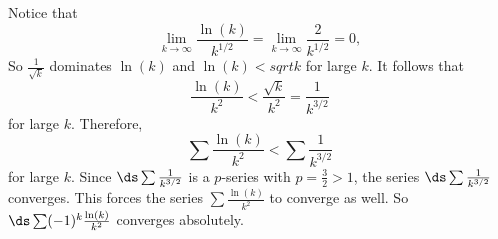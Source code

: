 \begin{activitySolution}
        \item Notice that
        \[\lim_{k \to \infty} \frac{ \ln(k) }{ k^{1/2} } = \lim_{k \to \infty} \frac{2}{k^{1/2}} = 0,\]
        So $\frac{1}{\sqrt{k}}$ dominates $\ln(k)$ and $\ln(k) < sqrt{k}$ for large $k$. It follows that
        \[\frac{\ln(k)}{k^2} < \frac{ \sqrt{k} }{k^2} = \frac{1}{k^{3/2}}\]
        for large $k$. Therefore,
        \[\sum \frac{\ln(k)}{k^2} < \sum \frac{1}{k^{3/2}}\]
        for large $k$. Since $\ds \sum \frac{1}{k^{3/2}}$ is a $p$-series with $p=\frac{3}{2} > 1$, the series $\ds \sum \frac{1}{k^{3/2}}$ converges. This forces the series $\sum \frac{\ln(k)}{k^2}$ to converge as well. So $\ds \sum (-1)^k \frac{\ln(k)}{k^2}$ converges absolutely.
        
        \etl
\ea
\end{activitySolution}
\aftera 